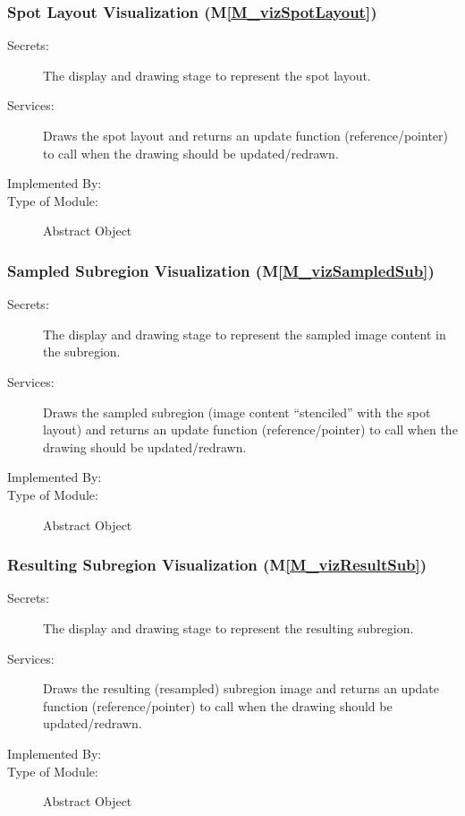 \documentclass[12pt, titlepage]{article}
\newcommand{\mref}[1]{M\ref{#1}}
\begin{document}
\subsubsection{Spot Layout Visualization (\mref{M_vizSpotLayout})}
\begin{description}
\item[Secrets:] The display and drawing stage to represent the spot layout.
\item[Services:] Draws the spot layout and returns an update function (reference/pointer)
  to call when the drawing should be updated/redrawn.
\item[Implemented By:] \progname{}
\item[Type of Module:] Abstract Object
\end{description}


\subsubsection{Sampled Subregion Visualization (\mref{M_vizSampledSub})}
\begin{description}
\item[Secrets:] The display and drawing stage to represent the sampled image content in the subregion.
\item[Services:] Draws the sampled subregion (image content ``stenciled'' with the spot layout)
  and returns an update function (reference/pointer) to call when the drawing should be updated/redrawn.
\item[Implemented By:] \progname{}
\item[Type of Module:] Abstract Object
\end{description}


\subsubsection{Resulting Subregion Visualization (\mref{M_vizResultSub})}
\begin{description}
\item[Secrets:] The display and drawing stage to represent the resulting subregion.
\item[Services:] Draws the resulting (resampled) subregion image 
  and returns an update function (reference/pointer) to call when the drawing
  should be updated/redrawn.
\item[Implemented By:] \progname{}
\item[Type of Module:] Abstract Object
\end{description}
\end{document}
